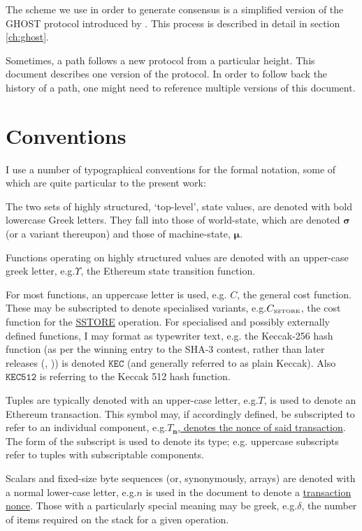 \documentclass[9pt,oneside]{amsart}
\makeatletter
\newcommand*\eg{e.g.\@\xspace}
\makeatother
\begin{document}
\begin{multicols}{2}
The scheme we use in order to generate consensus is a simplified version of the GHOST protocol introduced by \cite{cryptoeprint:2013:881}. This process is described in detail in section \ref{ch:ghost}.

Sometimes, a path follows a new protocol from a particular height.  This document describes one version of the protocol.  In order to follow back the history of a path, one might need to reference multiple versions of this document.

\section{Conventions}\label{ch:conventions}

I use a number of typographical conventions for the formal notation, some of which are quite particular to the present work:

The two sets of highly structured, `top-level', state values, are denoted with bold lowercase Greek letters. They fall into those of world-state, which are denoted $\boldsymbol{\sigma}$ (or a variant thereupon) and those of machine-state, $\boldsymbol{\mu}$.

Functions operating on highly structured values are denoted with an upper-case greek letter, \eg \hyperlink{Upsilon}{$\Upsilon$}, the Ethereum state transition function.

For most functions, an uppercase letter is used, e.g. $C$, the general cost function. These may be subscripted to denote specialised variants, \eg \hyperlink{C tiny SSTORE}{$C_\text{\tiny SSTORE}$}, the cost function for the \hyperlink{SSTORE}{\tiny SSTORE} operation. For specialised and possibly externally defined functions, I may format as typewriter text, \eg the Keccak-256 hash function (as per the winning entry to the SHA-3 contest, rather than later releases (\cite{Keccak}, \cite{KeccakWikipedia})) is denoted $\texttt{KEC}$ (and generally referred to as plain Keccak). Also $\texttt{KEC512}$ is referring to the Keccak 512 hash function.

Tuples are typically denoted with an upper-case letter, \eg $T$, is used to denote an Ethereum transaction. This symbol may, if accordingly defined, be subscripted to refer to an individual component, \eg  \hyperlink{transaction nonce}{$T_\mathbf{n}$, denotes the nonce of said transaction}. The form of the subscript is used to denote its type; \eg uppercase subscripts refer to tuples with subscriptable components.

Scalars and fixed-size byte sequences (or, synonymously, arrays) are denoted with a normal lower-case letter, \eg $n$ is used in the document to denote a \hyperlink{transaction nonce}{transaction nonce}. Those with a particularly special meaning may be greek, \eg $\delta$, the number of items required on the stack for a given operation.


\end{multicols}
\end{document}
